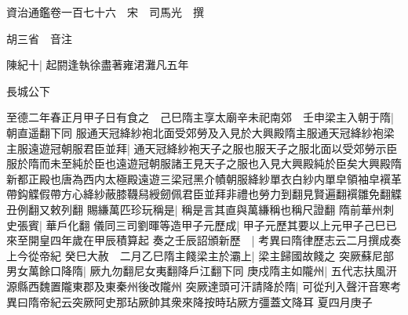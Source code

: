 資治通鑑卷一百七十六　宋　司馬光　撰

胡三省　音注

陳紀十|{
	起閼逢執徐盡著雍涒灘凡五年}


長城公下

至德二年春正月甲子日有食之　己巳隋主享太廟辛未祀南郊　壬申梁主入朝于隋|{
	朝直遥翻下同}
服通天冠絳紗袍北面受郊勞及入見於大興殿隋主服通天冠絳紗袍梁主服遠遊冠朝服君臣並拜|{
	通天冠絳紗袍天子之服也服天子之服北面以受郊勞示臣服於隋而未至純於臣也遠遊冠朝服諸王見天子之服也入見大興殿純於臣矣大興殿隋新都正殿也唐為西内太極殿遠遊三梁冠黑介幘朝服絳紗單衣白紗内單皁領袖皁襈革帶鈎䚢假帶方心絳紗蔽膝韈舄綬劒佩君臣並拜非禮也勞力到翻見賢遍翻襈雛免翻䚢丑例翻又敕列翻}
賜縑萬匹珍玩稱是|{
	稱是言其直與萬縑稱也稱尺證翻}
隋前華州刺史張賓|{
	華戶化翻}
儀同三司劉暉等造甲子元歷成|{
	甲子元歷其要以上元甲子己巳已來至開皇四年歲在甲辰積算起}
奏之壬辰詔頒新歷　|{
	考異曰隋律歷志云二月撰成奏上今從帝紀}
癸巳大赦　二月乙巳隋主餞梁主於灞上|{
	梁主歸國故餞之}
突厥蘇尼部男女萬餘口降隋|{
	厥九勿翻尼女夷翻降戶江翻下同}
庚戍隋主如隴州|{
	五代志扶風汧源縣西魏置隴東郡及東秦州後改隴州}
突厥達頭可汗請降於隋|{
	可從刋入聲汗音寒考異曰隋帝紀云突厥阿史那玷厥帥其衆來降按時玷厥方彊蓋文降耳}
夏四月庚子

